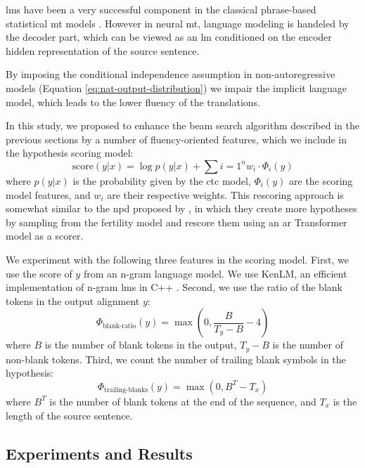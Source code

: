 \Acp{lm} have been a very successful component in the classical phrase-based
statistical \acs{mt} models \citep{koehn2009statistical}. However in neural
\acs{mt}, language modeling is handeled by the decoder part, which can be
viewed as an \acs{lm} conditioned on the encoder hidden representation of the
source sentence.

By imposing the conditional independence assumption in non-autoregressive
models (Equation \ref{eq:nat-output-distribution}) we impair the implicit
language model, which leads to the lower fluency of the translations.

In this study, we proposed to enhance the beam search algorithm described in
the previous sections  by a number of fluency-oriented
features, which we include in the hypothesis scoring model:
%
\begin{equation}
  \text{score}(y|x) = \log p(y|x) + \sum{i=1}^n w_i \cdot \Phi_i(y)
\end{equation}
%
where $p(y|x)$ is the probability given by the \acs{ctc} model, $\Phi_i(y)$ are
the scoring model features, and $w_i$ are their respective weights. This
rescoring approach is somewhat similar to the \ac{npd} proposed by
\citet{gu2017nonautoregressive}, in which they create more hypotheses by
sampling from the fertility model and rescore them using an \ac{ar} Transformer
model as a scorer.

We experiment with the following three features in the scoring model. First, we
use the score of $y$ from an n-gram language model. We use KenLM, an efficient
implementation of n-gram \acp{lm} in C++
\citep{heafield-2011-kenlm}. Second,
we use the ratio of the blank tokens in the output alignment $y$:
%
\begin{equation}
  \Phi_{\text{blank-ratio}}(y) = \max(0, \frac{B}{T_y - B} - 4 )
\end{equation}
%
where $B$ is the number of blank tokens in the output, $T_y - B$ is the number
of non-blank tokens. Third, we count the number of trailing blank symbols in
the hypothesis:
%
\begin{equation}
  \Phi_{\text{trailing-blanks}}(y) = \max(0, B^T - T_x)
\end{equation}
%
where $B^T$ is the number of blank tokens at the end of the sequence, and $T_x$
is the length of the source sentence.

\subsection{Experiments and Results}


